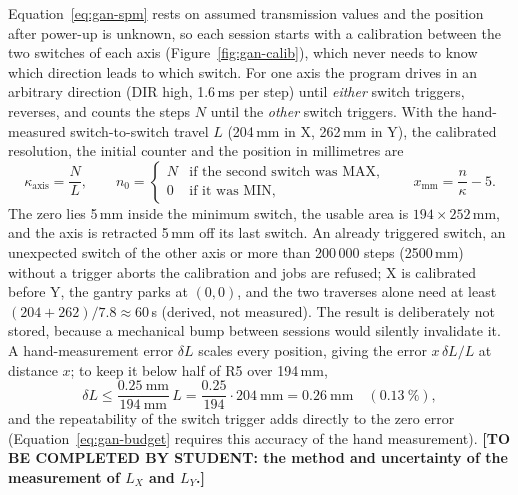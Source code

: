 Equation~\ref{eq:gan-spm} rests on assumed transmission values and the position after power-up is unknown, so each session starts with a calibration between the two switches of each axis (Figure~\ref{fig:gan-calib}), which never needs to know which direction leads to which switch.
For one axis the program drives in an arbitrary direction (DIR high, 1.6\,ms per step) until \emph{either} switch triggers, reverses, and counts the steps $N$ until the \emph{other} switch triggers.
With the hand-measured switch-to-switch travel $L$ (204\,mm in X, 262\,mm in Y), the calibrated resolution, the initial counter and the position in millimetres are
\begin{equation}
\kappa_{\mathrm{axis}}=\frac{N}{L},\qquad n_0=\begin{cases}N&\text{if the second switch was MAX,}\\0&\text{if it was MIN,}\end{cases}\qquad x_{\mathrm{mm}}=\frac{n}{\kappa}-5 .
\label{eq:gan-cal}
\end{equation}
The zero lies 5\,mm inside the minimum switch, the usable area is $194\times252$\,mm, and the axis is retracted 5\,mm off its last switch.
An already triggered switch, an unexpected switch of the other axis or more than 200\,000 steps (2500\,mm) without a trigger aborts the calibration and jobs are refused; X is calibrated before Y, the gantry parks at $(0,0)$, and the two traverses alone need at least $(204+262)/7.8\approx60$\,s (derived, not measured).
The result is deliberately not stored, because a mechanical bump between sessions would silently invalidate it.
A hand-measurement error $\delta L$ scales every position, giving the error $x\,\delta L/L$ at distance $x$; to keep it below half of R5 over 194\,mm,
\begin{equation}
\delta L\le\frac{0.25\ \mathrm{mm}}{194\ \mathrm{mm}}\,L=\frac{0.25}{194}\cdot204\ \mathrm{mm}=0.26\ \mathrm{mm}\quad(0.13\ \%),
\label{eq:gan-budget}
\end{equation}
and the repeatability of the switch trigger adds directly to the zero error (Equation~\ref{eq:gan-budget} requires this accuracy of the hand measurement).
\textbf{[TO BE COMPLETED BY STUDENT: the method and uncertainty of the measurement of $L_X$ and $L_Y$.]}

